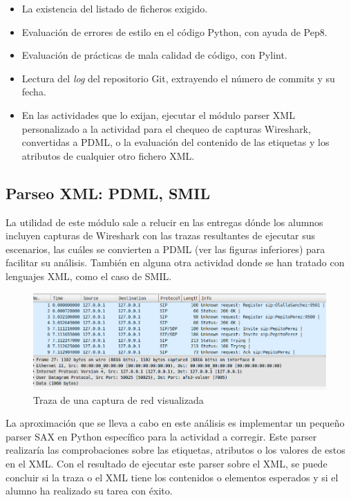 \begin{itemize}
\item La existencia del listado de ficheros exigido.

\item Evaluación de errores de estilo en el código Python, con ayuda de Pep8.

\item Evaluación de prácticas de mala calidad de código, con Pylint.

\item Lectura del \textit{log} del repositorio Git, extrayendo el número de commits y su fecha.

\item En las actividades que lo exijan, ejecutar el módulo parser XML personalizado a la actividad para el chequeo de capturas Wireshark, convertidas a PDML, o la evaluación del contenido de las etiquetas y los atributos de cualquier otro fichero XML.
\end{itemize}


\subsection{Parseo XML: PDML, SMIL}
\label{sec:parseo}

La utilidad de este módulo sale a relucir en las entregas dónde los alumnos incluyen capturas de Wireshark con las trazas resultantes de ejecutar sus escenarios, las cuáles se convierten a PDML (ver las figuras inferiores) para facilitar su análisis. También en alguna otra actividad donde se han tratado con lenguajes XML, como el caso de SMIL.


\begin{figure}[H]
   \centering
   \includegraphics[width=16cm]{img/Selection_014_traza_wireshark}
   \caption{Traza de una captura de red visualizada}
   \label{figura:traza_wireshark}
\end{figure}

La aproximación que se lleva a cabo en este análisis es implementar un pequeño parser SAX en Python específico para la actividad a corregir. Este parser realizaría las comprobaciones sobre las etiquetas, atributos o los valores de estos en el XML. Con el resultado de ejecutar este parser sobre el XML, se puede concluir si la traza o el XML tiene los contenidos o elementos esperados y si el alumno ha realizado su tarea con éxito.



